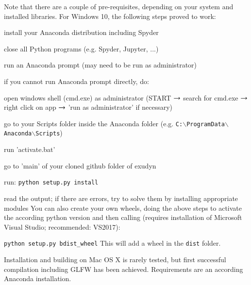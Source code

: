 
\label{sec:build:windows}
Note that there are a couple of pre-requisites, depending on your system and installed libraries. For Windows 10, the following steps proved to work:
\bi
  \item install your Anaconda distribution including Spyder
  \item close all Python programs (e.g. Spyder, Jupyter, ...)
	\item run an Anaconda prompt (may need to be run as administrator)
	\item if you cannot run Anaconda prompt directly, do:
	\bi
	  \item open windows shell (cmd.exe) as administrator (START $\rightarrow$ search for cmd.exe $\rightarrow$ right click on app $\rightarrow$ 'run as administrator' if necessary)
		\item go to your Scripts folder inside the Anaconda folder (e.g. \texttt{C:$\backslash$ProgramData$\backslash$Anaconda$\backslash$Scripts})
	  \item run 'activate.bat'
	\ei
	\item go to 'main' of your cloned github folder of exudyn
	\item run: \texttt{python setup.py install}
	\item read the output; if there are errors, try to solve them by installing appropriate modules
\ei
You can also create your own wheels, doing the above steps to activate the according python version and then calling (requires installation of Microsoft Visual Studio; recommended: VS2017):
\bi
  \item[] \texttt{python setup.py bdist\_wheel}
\ei
This will add a wheel in the \texttt{dist} folder.

\label{sec:build:MacOS}
Installation and building on Mac OS X is rarely tested, but first successful compilation including GLFW has been achieved.
Requirements are an according Anaconda installation.

